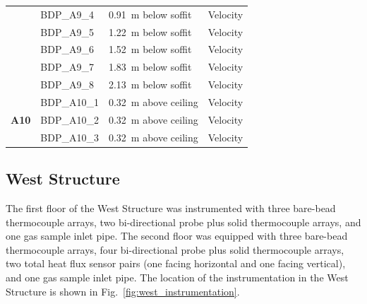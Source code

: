 \documentclass[12pt,oneside]{book}
\begin{document}
\begin{longtable}[c]{c|lll}
 & BDP\_A9\_4 & 0.91~m below soffit  & Velocity \\
 & BDP\_A9\_5 & 1.22~m below soffit  & Velocity \\
 & BDP\_A9\_6 & 1.52~m below soffit  & Velocity \\
 & BDP\_A9\_7 & 1.83~m below soffit  & Velocity \\
 & BDP\_A9\_8 & 2.13~m below soffit  & Velocity \\
\midrule
\multirow{3}{*}{\large{\textbf{A10}}}
 & BDP\_A10\_1 & 0.32~m above ceiling & Velocity \\
 & BDP\_A10\_2 & 0.32~m above ceiling & Velocity \\
 & BDP\_A10\_3 & 0.32~m above ceiling & Velocity \\
\bottomrule
\end{longtable}
\clearpage

\subsection{West Structure}
The first floor of the West Structure was instrumented with three bare-bead thermocouple arrays, two bi-directional probe plus solid thermocouple arrays, and one gas sample inlet pipe. The second floor was equipped with three bare-bead thermocouple arrays, four bi-directional probe plus solid thermocouple arrays, two total heat flux sensor pairs (one facing horizontal and one facing vertical), and one gas sample inlet pipe. The location of the instrumentation in the West Structure is shown in Fig.~\ref{fig:west_instrumentation}.
\end{document}

